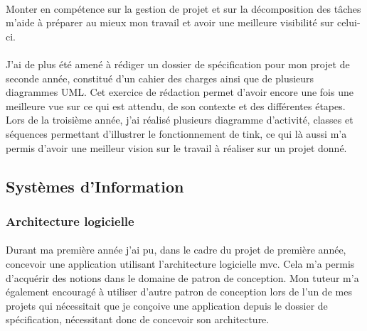 \documentclass[12pt,a4paper]{report}
\begin{document}
\paragraph*{}Monter en compétence sur la gestion de projet et sur la décomposition des tâches m'aide à préparer au mieux mon travail et avoir une meilleure visibilité sur celui-ci.
\paragraph*{}J'ai de plus été amené à rédiger un dossier de spécification pour mon projet de seconde année, constitué d'un cahier des charges ainsi que de plusieurs diagrammes UML. Cet exercice de rédaction permet d'avoir encore une fois une meilleure vue sur ce qui est attendu, de son contexte et des différentes étapes. Lors de la troisième année, j'ai réalisé plusieurs diagramme d'activité, classes et séquences permettant d'illustrer le fonctionnement de \gls{tink}, ce qui là aussi m'a permis d'avoir une meilleur vision sur le travail à réaliser sur un projet donné.\\

\subsection{Systèmes d'Information}
\subsubsection{Architecture logicielle}
\paragraph*{}Durant ma première année j’ai pu, dans le cadre du projet de première année, concevoir une application utilisant l’architecture logicielle \gls{mvc}. Cela m’a permis d'acquérir des notions dans le domaine de patron de conception. Mon tuteur m’a également encouragé à utiliser d'autre patron de conception lors de l’un de mes projets qui nécessitait que je conçoive une application depuis le dossier de spécification, nécessitant donc de concevoir son architecture.
\end{document}
